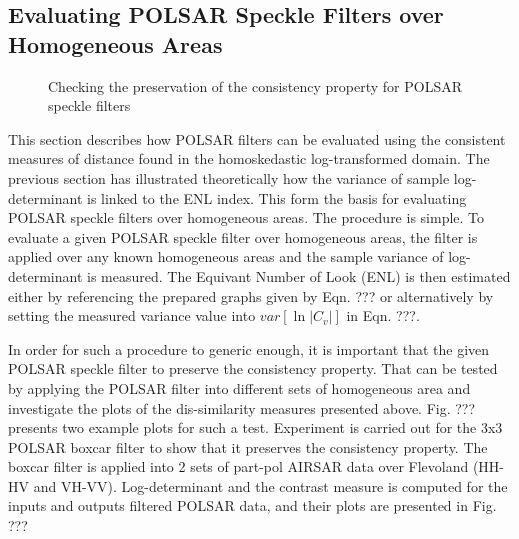 \subsection{Evaluating POLSAR Speckle Filters over Homogeneous Areas}

\begin{figure}
	\hfill	
  \caption{Checking the preservation of the consistency property for POLSAR speckle filters}  
\end{figure}

This section describes how POLSAR filters can be evaluated
  using the consistent measures of distance found in the homoskedastic log-transformed domain.
The previous section has illustrated theoretically how the variance of sample log-determinant is linked to the ENL index.
This form the basis for evaluating POLSAR speckle filters over homogeneous areas.
The procedure is simple.
To evaluate a given POLSAR speckle filter over homogeneous areas,
  the filter is applied over any known homogeneous areas and the sample variance of log-determinant is measured.
The Equivant Number of Look (ENL) is then estimated
  either by referencing the prepared graphs given by Eqn. ???
  or alternatively by setting the measured variance value into $var[\ln{|C_v|}]$ in Eqn. ???.

In order for such a procedure to generic enough, it is important that the given POLSAR speckle filter to preserve the consistency property.
That can be tested by applying the POLSAR filter into different sets of homogeneous area and investigate the plots of the dis-similarity measures presented above.
Fig. ??? presents two example plots for such a test.
Experiment is carried out for the 3x3 POLSAR boxcar filter to show that it preserves the consistency property.
The boxcar filter is applied into 2 sets of part-pol AIRSAR data over Flevoland (HH-HV and VH-VV).
Log-determinant and the contrast measure is computed for the inputs and outputs filtered POLSAR data,
  and their plots are presented in Fig. ???

